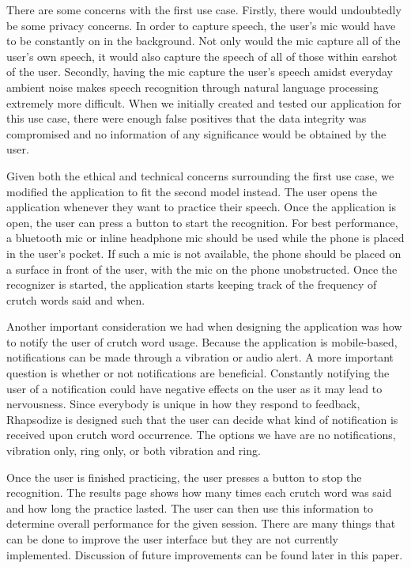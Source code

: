\documentclass{sigchi}
\begin{document}
There are some concerns with the first use case. Firstly, there would undoubtedly be some privacy concerns. In order to capture speech, the user’s mic would have to be constantly on in the background. Not only would the mic capture all of the user’s own speech, it would also capture the speech of all of those within earshot of the user. Secondly, having the mic capture the user’s speech amidst everyday ambient noise makes speech recognition through natural language processing extremely more difficult. When we initially created and tested our application for this use case, there were enough false positives that the data integrity was compromised and no information of any significance would be obtained by the user.

Given both the ethical and technical concerns surrounding the first use case, we modified the application to fit the second model instead. The user opens the application whenever they want to practice their speech. Once the application is open, the user can press a button to start the recognition. For best performance, a bluetooth mic or inline headphone mic should be used while the phone is placed in the user’s pocket. If such a mic is not available, the phone should be placed on a surface in front of the user, with the mic on the phone unobstructed. Once the recognizer is started, the application starts keeping track of the frequency of crutch words said and when. 

Another important consideration we had when designing the application was how to notify the user of crutch word usage. Because the application is mobile-based, notifications can be made through a vibration or audio alert. A more important question is whether or not notifications are beneficial. Constantly notifying the user of a notification could have negative effects on the user as it may lead to nervousness. Since everybody is unique in how they respond to feedback, Rhapsodize is designed such that the user can decide what kind of notification is received upon crutch word occurrence. The options we have are no notifications, vibration only, ring only, or both vibration and ring. 

Once the user is finished practicing, the user presses a button to stop the recognition. The results page shows how many times each crutch word was said and how long the practice lasted. The user can then use this information to determine overall performance for the given session. There are many things that can be done to improve the user interface but they are not currently implemented. Discussion of future improvements can be found later in this paper.
\end{document}
